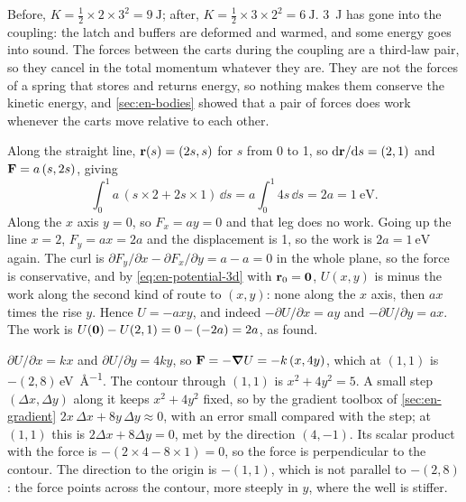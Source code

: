 Before, $K = \frac12\times2\times3^2 =
\SI{9}{\joule}$; after, $K = \frac12\times3\times2^2 = \SI{6}{\joule}$.
\SI{3}{\joule} has gone into the coupling: the latch and buffers are
deformed and warmed, and some energy goes into sound. The forces between
the carts during the coupling are a third-law pair, so they cancel in the
total momentum whatever they are. They are not the forces of a spring
that stores and returns energy, so nothing makes them conserve the
kinetic energy, and \cref{sec:en-bodies} showed that a pair of forces
does work whenever the carts move relative to each other.

Along the straight line, $\bm{\mathrm{r}}(s) = (2s, s)$
for $s$ from 0 to 1, so $\mathrm{d}\bm{\mathrm{r}}/\mathrm{d} s = (2, 1)$ and $\bm{\mathrm{F}} = a\,(s,
2s)$, giving
\begin{equation*}
   \int_0^1 a\,(s\times2 + 2s\times1)\,\dd s = a\int_0^1 4s\,\dd s = 2a
   = \SI{1}{\electronvolt} .
\end{equation*}
Along the $x$ axis $y = 0$, so $F_x = ay = 0$ and that leg does no work.
Going up the line $x = 2$, $F_y = ax = 2a$ and the displacement is 1, so
the work is $2a = \SI{1}{\electronvolt}$ again. The curl is $\partial
F_y/\partial x - \partial F_x/\partial y = a - a = 0$ in the whole plane,
so the force is conservative, and by \cref{eq:en-potential-3d} with
$\bm{\mathrm{r}}_0 = \bm{\mathrm{0}}$, $U(x, y)$ is minus the work along the second kind of
route to $(x, y)$: none along the $x$ axis, then $ax$ times the rise $y$.
Hence $U = -axy$, and indeed $-\partial U/\partial x = ay$ and
$-\partial U/\partial y = ax$. The work is $U(\bm{\mathrm{0}}) - U(2, 1) = 0 -
(-2a) = 2a$, as found.

$\partial U/\partial x = kx$ and $\partial
U/\partial y = 4ky$, so $\bm{\mathrm{F}} = -\bm{\nabla} U = -k\,(x, 4y)$, which at $(1,
1)$ is $-(2, 8)$\,\si{\electronvolt\per\angstrom}. The contour through
$(1, 1)$ is $x^2 + 4y^2 = 5$. A small step $(\Delta x, \Delta y)$ along it
keeps $x^2 + 4y^2$ fixed, so by the gradient toolbox of
\cref{sec:en-gradient} $2x\,\Delta x + 8y\,\Delta y \approx 0$, with an
error small compared with the step; at $(1, 1)$ this is $2\Delta x +
8\Delta y = 0$, met by the direction $(4, -1)$. Its scalar product with the force is $-(2\times4 - 8\times1)
= 0$, so the force is perpendicular to the contour. The direction to the
origin is $-(1, 1)$, which is not parallel to $-(2, 8)$: the force points
across the contour, more steeply in $y$, where the well is stiffer.


